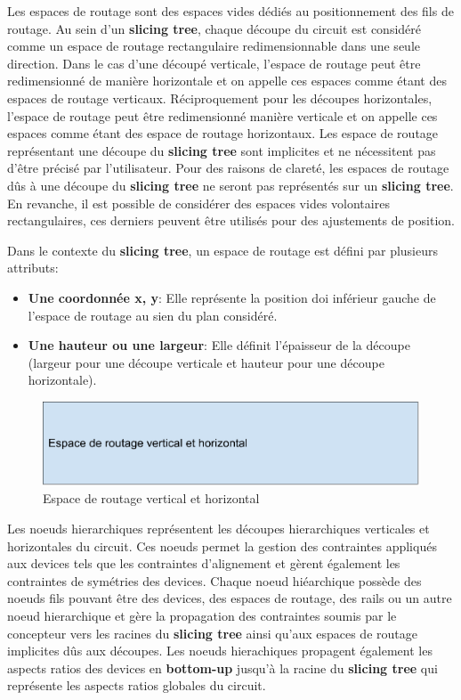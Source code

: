 \indent Les espaces de routage sont des espaces vides dédiés au positionnement des fils de routage. Au sein d'un \textbf{slicing tree}, chaque découpe du circuit est considéré comme un espace de routage rectangulaire redimensionnable dans une seule direction. Dans le cas d'une découpé verticale, l'espace de routage peut être redimensionné de manière horizontale et on appelle ces espaces comme étant des espaces de routage verticaux. Réciproquement pour les découpes horizontales, l'espace de routage peut être redimensionné manière verticale et on appelle ces espaces comme étant des espace de routage horizontaux. Les espace de routage représentant une découpe du \textbf{slicing tree} sont implicites et ne nécessitent pas d'être précisé par l'utilisateur. Pour des raisons de clareté, les espaces de routage dûs à une découpe du \textbf{slicing tree} ne seront pas représentés sur un \textbf{slicing tree}. En revanche, il est possible de considérer des espaces vides volontaires rectangulaires, ces derniers peuvent être utilisés pour des ajustements de position.\newline

\indent Dans le contexte du \textbf{slicing tree}, un espace de routage est défini par plusieurs attributs:
\begin{itemize}
\item \textbf{Une coordonnée x, y}: Elle représente la position doi inférieur gauche de l'espace de routage au sien du plan considéré.
\item \textbf{Une hauteur ou une largeur}: Elle définit l'épaisseur de la découpe (largeur pour une découpe verticale et hauteur pour une découpe horizontale).
\end{itemize}
\begin{figure}[h]
\begin{center}
\includegraphics[height=0.11\textheight]{Figures/13.pdf}
\caption{Espace de routage vertical et horizontal}
\label{fig:12}
\end{center}
\end{figure} 

Les noeuds hierarchiques représentent les découpes hierarchiques verticales et horizontales du circuit. Ces noeuds permet la gestion des contraintes appliqués aux devices tels que les contraintes d'alignement et gèrent également les contraintes de symétries des devices. Chaque noeud hiéarchique possède des noeuds fils pouvant être des devices, des espaces de routage, des rails ou un autre noeud hierarchique et gère la propagation des contraintes soumis par le concepteur vers les racines du \textbf{slicing tree} ainsi qu'aux espaces de routage implicites dûs aux découpes. Les noeuds hierachiques propagent également les aspects ratios des devices en \textbf{bottom-up} jusqu'à la racine du \textbf{slicing tree} qui représente les aspects ratios globales du circuit. \newline

